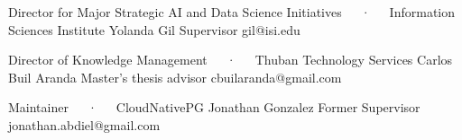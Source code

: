 
\begin{cventries}

   \cventry
   {Director for Major Strategic AI and Data Science Initiatives~~~·~~~Information Sciences Institute} %
   {Yolanda Gil} %
   {Supervisor} %
   {gil@isi.edu} %
   {} %

   \cventry
   {Director of Knowledge Management~~~·~~~Thuban Technology Services} %
   {Carlos Buil Aranda} %
   {Master’s thesis advisor} %
   {cbuilaranda@gmail.com} %
   {} %

   \cventry
   {Maintainer~~~·~~~CloudNativePG} %
   {Jonathan Gonzalez} %
   {Former Supervisor} %
   {jonathan.abdiel@gmail.com} %
   {} %
\end{cventries}
